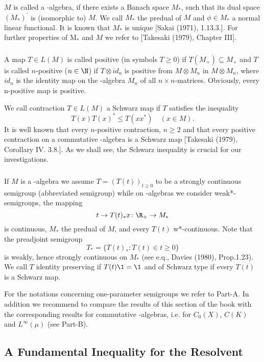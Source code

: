 \documentclass[%
,parskip = full
,english
,fontsize = 12pt]
	{scrartcl}
\begin{document}
$ M $ is called a \WA-algebra, if there exists a Banach space $M_{*}$, such that its dual space $ (M_{*})^{'}$ is (isomorphic to) $M$. 
We call $M_{*}$ the predual of $M$ and $\phi \in M_{*}$ a normal linear functional. 
It is known that $M_{*}$ is unique [Sakai (1971), 1.13.3.]. For further properties of $\mathrm{M}_{*}$ and $ M $ we refer to [Takesaki (1979), Chapter III].%
\subsubsection{}
A map $ T \in L(M) $ is called positive (in symbols $ T \geq 0 $) if 
$ T (M_{+}) \subseteq M_{+} $ and $ T $ is called $ n $-positive ($n \in \N$) if $T \otimes id_{n} $ is positive from $ M  \otimes M_{n} $ in $ M \otimes M_{n} $, where $id_{n}$ is the identity map on the \CA-algebra $ M_{n} $ of all $ n \times n $-matrices. 
Obviously, every n-positive map is positive. 

We call contraction $T \in L(M)$ a Schwarz map if $T$ satisfies the inequality
%
\[
	T(x) T(x)^{*} \leq T (x x^{*} ) \quad  (x \in M).
\]
%
It is well known that every $n$-positive contraction, $n \geq 2$ and that every positive contraction on a commutative \CA-algebra is a Schwarz map [Takesaki (1979), Corollary IV. 3.8.]. As we shall see, the Schwarz inequality is crucial for our investigations.

\subsubsection{}
If $ M $ is a \CA-algebra we assume $ T = (T(t))_{t \geq 0}$ to be a strongly continuous semigroup (abbreviated semigroup) while on \WA-algebras we consider weak*-semigroups, \ie the mapping 
%
\[
	 t \to T(t)_{*} x \colon \R_{+} \to M_{*}
\]
%
is continuous, $M_{*}$ the predual of $M$, and every $T(t)$ w*-continuous. 
Note that the preadjoint semigroup
%
\[
	T_{*}=\{T(t)_{*}: T(t) \in t \geq 0 \}
\]
%
is weakly, hence strongly continuous on $M_{*}$ (see e.q., Davies (1980), Prop.1.23). 
We call $T$ identity preserving if $T(t) \1 = \1$ and of Schwarz type if every $T(t)$ is a Schwarz map.

For the notations concerning one-parameter semigroups we refer to Part-A. 
In addition we recommend to compare the results of this section of the book with the corresponding results for commutative \CA-algebras, i.e. for $C_{0}(X)$, $ C(K)$ and $L^{\infty}(\mu)$ (see Part-B).

\subsection{A Fundamental Inequality for the Resolvent}
\end{document}
